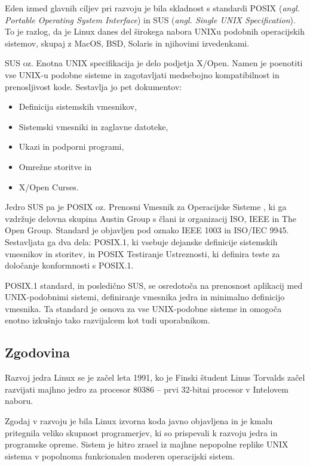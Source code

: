 \documentclass[a4paper,12pt,openright]{book}
\begin{document}
Eden izmed glavnih ciljev pri razvoju je bila skladnost s standardi POSIX (\textit{angl. Portable Operating System Interface}) in SUS (\textit{angl. Single UNIX Specification}).
To je razlog, da je Linux danes del širokega nabora UNIXu podobnih operacijskih sistemov, skupaj z MacOS, BSD, Solaris in njihovimi izvedenkami.

SUS oz. Enotna UNIX specifikacija \cite{SUS_2020} je delo podjetja X/Open. Namen je poenotiti vse UNIX-u podobne sisteme in zagotavljati medsebojno kompatibilnost in prenosljivost kode.
Sestavlja jo pet dokumentov:
\begin{itemize}
	\item Definicija sistemskih vmesnikov,
	\item Sistemski vmesniki in zaglavne datoteke,
	\item Ukazi in podporni programi,
	\item Omrežne storitve in
	\item X/Open Curses.
\end{itemize}

Jedro SUS pa je POSIX oz. Prenosni Vmesnik za Operacijske Sisteme \cite{POSIX.1_2024}, ki ga vzdržuje delovna skupina Austin Group s člani iz organizacij ISO, IEEE in The Open Group.
Standard je objavljen pod oznako IEEE 1003 in ISO/IEC 9945.
Sestavljata ga dva dela: POSIX.1, ki vsebuje dejanske definicije sistemskih vmesnikov in storitev, in POSIX Testiranje Ustreznosti, ki definira teste za določanje konformnosti s POSIX.1.

POSIX.1 standard, in posledično SUS, se osredotoča na prenosnost aplikacij med UNIX-podobnimi sistemi, definiranje vmesnika jedra in minimalno definicijo vmesnika.
Ta standard je osnova za vse UNIX-podobne sisteme in omogoča enotno izkušnjo tako razvijalcem kot tudi uporabnikom.

\subsection{Zgodovina}

Razvoj jedra Linux se je začel leta 1991, ko je Finski študent Linus Torvalds začel razvijati majhno jedro za procesor 80386 -- prvi 32-bitni procesor v Intelovem naboru.

Zgodaj v razvoju je bila Linux izvorna koda javno objavljena in je kmalu pritegnila veliko skupnost programerjev, ki so prispevali k razvoju jedra in programske opreme.
Sistem je hitro zrasel iz majhne nepopolne replike UNIX sistema v popolnoma funkcionalen moderen operacijski sistem.
\end{document}
